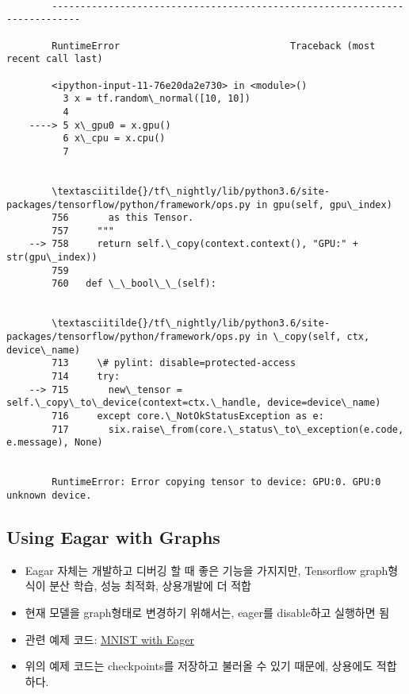 \documentclass[11pt]{article}
\providecommand{\tightlist}{%
      \setlength{\itemsep}{0pt}\setlength{\parskip}{0pt}}
\begin{document}
    \begin{Verbatim}[commandchars=\\\{\}]

        ---------------------------------------------------------------------------

        RuntimeError                              Traceback (most recent call last)

        <ipython-input-11-76e20da2e730> in <module>()
          3 x = tf.random\_normal([10, 10])
          4 
    ----> 5 x\_gpu0 = x.gpu()
          6 x\_cpu = x.cpu()
          7 


        \textasciitilde{}/tf\_nightly/lib/python3.6/site-packages/tensorflow/python/framework/ops.py in gpu(self, gpu\_index)
        756       as this Tensor.
        757     """
    --> 758     return self.\_copy(context.context(), "GPU:" + str(gpu\_index))
        759 
        760   def \_\_bool\_\_(self):


        \textasciitilde{}/tf\_nightly/lib/python3.6/site-packages/tensorflow/python/framework/ops.py in \_copy(self, ctx, device\_name)
        713     \# pylint: disable=protected-access
        714     try:
    --> 715       new\_tensor = self.\_copy\_to\_device(context=ctx.\_handle, device=device\_name)
        716     except core.\_NotOkStatusException as e:
        717       six.raise\_from(core.\_status\_to\_exception(e.code, e.message), None)


        RuntimeError: Error copying tensor to device: GPU:0. GPU:0 unknown device.

    \end{Verbatim}

    \hypertarget{using-eagar-with-graphs}{%
\subsection{Using Eagar with Graphs}\label{using-eagar-with-graphs}}

\begin{itemize}
\tightlist
\item
  Eagar 자체는 개발하고 디버깅 할 때 좋은 기능을 가지지만, Tensorflow
  graph형식이 분산 학습, 성능 최적화, 상용개발에 더 적합
\item
  현재 모델을 graph형태로 변경하기 위해서는, eager를 disable하고
  실행하면 됨
\item
  관련 예제 코드:
  \href{https://github.com/tensorflow/tensorflow/tree/master/tensorflow/contrib/eager/python/examples/mnist}{MNIST
  with Eager}
\item
  위의 예제 코드는 checkpoints를 저장하고 불러올 수 있기 때문에,
  상용에도 적합하다.
\end{itemize}
\end{document}
